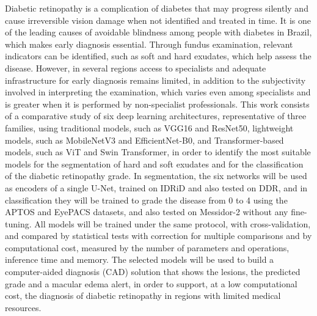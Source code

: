 Diabetic retinopathy is a complication of diabetes that may progress silently and cause irreversible vision damage when not identified and treated in time. It is one of the leading causes of avoidable blindness among people with diabetes in Brazil, which makes early diagnosis essential. Through fundus examination, relevant indicators can be identified, such as soft and hard exudates, which help assess the disease. However, in several regions access to specialists and adequate infrastructure for early diagnosis remains limited, in addition to the subjectivity involved in interpreting the examination, which varies even among specialists and is greater when it is performed by non-specialist professionals. This work consists of a comparative study of six deep learning architectures, representative of three families, using traditional models, such as VGG16 and ResNet50, lightweight models, such as MobileNetV3 and EfficientNet-B0, and Transformer-based models, such as ViT and Swin Transformer, in order to identify the most suitable models for the segmentation of hard and soft exudates and for the classification of the diabetic retinopathy grade. In segmentation, the six networks will be used as encoders of a single U-Net, trained on IDRiD and also tested on DDR, and in classification they will be trained to grade the disease from 0 to 4 using the APTOS and EyePACS datasets, and also tested on Messidor-2 without any fine-tuning. All models will be trained under the same protocol, with cross-validation, and compared by statistical tests with correction for multiple comparisons and by computational cost, measured by the number of parameters and operations, inference time and memory. The selected models will be used to build a computer-aided diagnosis (CAD) solution that shows the lesions, the predicted grade and a macular edema alert, in order to support, at a low computational cost, the diagnosis of diabetic retinopathy in regions with limited medical resources.

